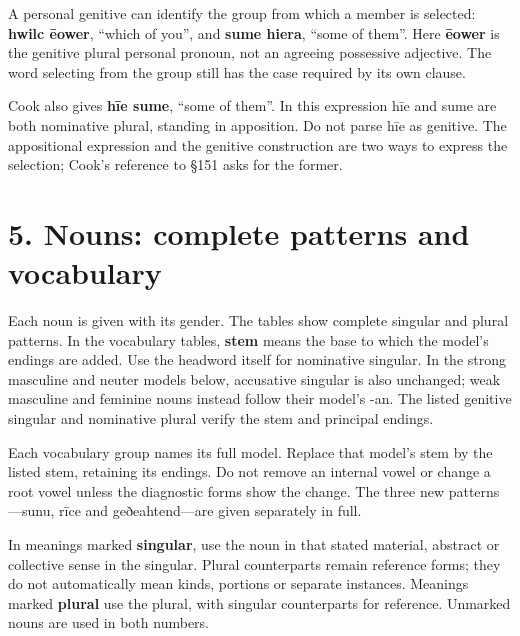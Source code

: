 A personal genitive can identify the group from which a member is selected: \textbf{hwilc ēower}, “which of you”, and \textbf{sume hiera}, “some of them”. Here \textbf{ēower} is the genitive plural personal pronoun, not an agreeing possessive adjective. The word selecting from the group still has the case required by its own clause.

Cook also gives \textbf{hīe sume}, “some of them”. In this expression hīe and sume are both nominative plural, standing in apposition. Do not parse hīe as genitive. The appositional expression and the genitive construction are two ways to express the selection; Cook’s reference to §151 asks for the former.

\section*{5. Nouns: complete patterns and vocabulary}

Each noun is given with its gender. The tables show complete singular and plural patterns. In the vocabulary tables, \textbf{stem} means the base to which the model’s endings are added. Use the headword itself for nominative singular. In the strong masculine and neuter models below, accusative singular is also unchanged; weak masculine and feminine nouns instead follow their model’s -an. The listed genitive singular and nominative plural verify the stem and principal endings.

Each vocabulary group names its full model. Replace that model’s stem by the listed stem, retaining its endings. Do not remove an internal vowel or change a root vowel unless the diagnostic forms show the change. The three new patterns—sunu, rīce and geðeahtend—are given separately in full.

In meanings marked \textbf{singular}, use the noun in that stated material, abstract or collective sense in the singular. Plural counterparts remain reference forms; they do not automatically mean kinds, portions or separate instances. Meanings marked \textbf{plural} use the plural, with singular counterparts for reference. Unmarked nouns are used in both numbers.

